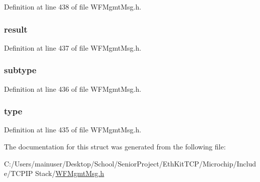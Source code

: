 Definition at line 438 of file W\+F\+Mgmt\+Msg.\+h.

\hypertarget{structmgmt_rx_hdr_struct_a77ca38f5799927d72f2b120713cd04f1}{}
\subsubsection[{result}]{ result}\label{structmgmt_rx_hdr_struct_a77ca38f5799927d72f2b120713cd04f1}


Definition at line 437 of file W\+F\+Mgmt\+Msg.\+h.

\hypertarget{structmgmt_rx_hdr_struct_ac6f7a21e76e96bc4dde6e4813e64d00d}{}
\subsubsection[{subtype}]{ subtype}\label{structmgmt_rx_hdr_struct_ac6f7a21e76e96bc4dde6e4813e64d00d}


Definition at line 436 of file W\+F\+Mgmt\+Msg.\+h.

\hypertarget{structmgmt_rx_hdr_struct_a631bceb766461ab7475c7ed56717aac8}{}
\subsubsection[{type}]{ type}\label{structmgmt_rx_hdr_struct_a631bceb766461ab7475c7ed56717aac8}


Definition at line 435 of file W\+F\+Mgmt\+Msg.\+h.



The documentation for this struct was generated from the following file\+:\begin{DoxyCompactItemize}
\item 
C\+:/\+Users/mainuser/\+Desktop/\+School/\+Senior\+Project/\+Eth\+Kit\+T\+C\+P/\+Microchip/\+Include/\+T\+C\+P\+I\+P Stack/\hyperlink{_w_f_mgmt_msg_8h}{W\+F\+Mgmt\+Msg.\+h}\end{DoxyCompactItemize}
